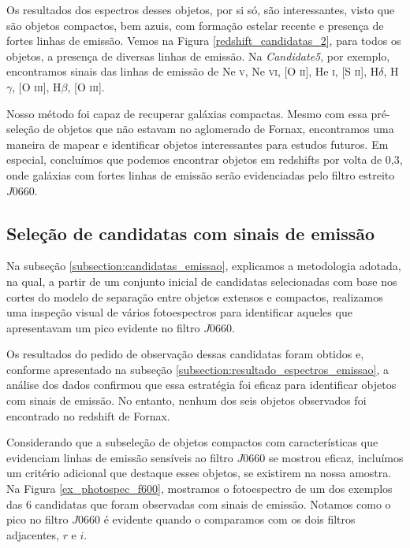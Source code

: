 Os resultados dos espectros desses objetos, por si só, são interessantes, visto que são objetos compactos, bem azuis, com formação estelar recente e presença de fortes linhas de emissão. Vemos na Figura \ref{redshift_candidatas_2}, para todos os objetos, a presença de diversas linhas de emissão. Na \textit{Candidate5}, por exemplo, encontramos sinais das linhas de emissão de Ne \textsc{v}, Ne \textsc{vi}, [O \textsc{ii}], He \textsc{i}, [S \textsc{ii}], H$\delta$, H$\gamma$, [O \textsc{iii}], H$\beta$, [O \textsc{iii}].

Nosso método foi capaz de recuperar galáxias compactas. Mesmo com essa pré-seleção de objetos que não estavam no aglomerado de Fornax, encontramos uma maneira de mapear e identificar objetos interessantes para estudos futuros. Em especial, concluímos que podemos encontrar objetos em redshifts por volta de 0,3, onde galáxias com fortes linhas de emissão serão evidenciadas pelo filtro estreito $J0660$.

\subsection{Seleção de candidatas com sinais de emissão} \label{subsec:candidatas_emissao}
Na subseção \ref{subsection:candidatas_emissao}, explicamos a metodologia adotada, na qual, a partir de um conjunto inicial de candidatas selecionadas com base nos cortes do modelo de separação entre objetos extensos e compactos, realizamos uma inspeção visual de vários fotoespectros para identificar aqueles que apresentavam um pico evidente no filtro $J0660$.

Os resultados do pedido de observação dessas candidatas foram obtidos e, conforme apresentado na subseção \ref{subsection:resultado_espectros_emissao}, a análise dos dados confirmou que essa estratégia foi eficaz para identificar objetos com sinais de emissão. No entanto, nenhum dos seis objetos observados foi encontrado no redshift de Fornax.


Considerando que a subseleção de objetos compactos com características que evidenciam linhas de emissão sensíveis ao filtro $J0660$ se mostrou eficaz, incluímos um critério adicional que destaque esses objetos, se existirem na nossa amostra. Na Figura \ref{ex_photospec_f600}, mostramos o fotoespectro de um dos exemplos das 6 candidatas que foram observadas com sinais de emissão. Notamos como o pico no filtro $J0660$ é evidente quando o comparamos com os dois filtros adjacentes, $r$ e $i$.

